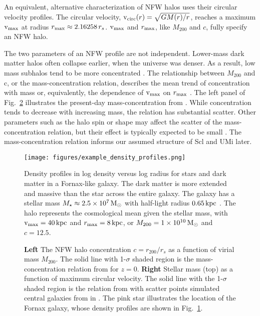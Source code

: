 An equivalent, alternative characterization of NFW halos uses their
circular velocity profiles. The circular velocity,
\({\rm v}_{\rm circ}(r) = \sqrt{G M(r) / r}\), reaches a maximum \({\rm v}_{\rm max}\) at radius
\(r_{\rm max} \approx 2.16258\,r_s\). \({\rm v}_{\rm max}\) and \(r_{\rm max}\), like
\(M_{200}\) and \(c\), fully specify an NFW halo.

The two parameters of an NFW profile are not independent. Lower-mass
dark matter halos often collapse earlier, when the universe was denser.
As a result, low mass subhalos tend to be more concentrated
\citep[e.g.,][]{NFW1997}. The relationship between \(M_{200}\) and c, or
the mass-concentration relation, describes the mean trend of
concentration with mass or, equivalently, the dependence of \({\rm v}_{\rm max}\) on
\(r_{\rm max}\) \citep[e.g.,][]{bullock+2001, ludlow+2016}. The left panel of
Fig.~\ref{fig:smhm} illustrates the present-day mass-concentration from
\citet{ludlow+2016}. While concentration tends to decrease with
increasing mass, the relation has substantial scatter. Other parameters
such as the halo spin or shape may affect the scatter of the
mass-concentration relation, but their effect is typically expected to
be small \citep{navarro+2010, dicintio+2013, dutton+maccio2014}. The
mass-concentration relation informs our assumed structure of Scl and UMi
later.

\begin{figure}
\centering
\texttt{[image: figures/example\_density\_profiles.png]}
\caption[Example dark matter and stellar density profiles]{Density
profiles in log density versus log radius for stars and dark matter in a
Fornax-like galaxy. The dark matter is more extended and massive than
the star across the entire galaxy. The galaxy has a stellar mass
\(M_\star \approx 2.5\times10^7\,{\rm M}_{\odot}\) with half-light radius
\(0.65\,{\rm kpc}\) \citep{munoz+2018, woo+courteau+dekel2008}. The halo
represents the cosmological mean given the stellar mass, with
\({\rm v}_{\rm max}=40\,{\rm kpc}\) and \(r_{\rm max}=8\,{\rm kpc}\), or
\(M_{200} = 1\times10^{10}\,{\rm M}_{\odot}\) and
\(c=12.5\).}\label{fig:nfw_density}
\end{figure}

\begin{figure}
\centering
{}
\caption[Cosmological halo mass and stellar mass
relations]{\textbf{Left} The NFW halo concentration \(c=r_{200} / r_s\)
as a function of virial mass \(M_{200}\). The solid line with
1-\(\sigma\) shaded region is the mass-concentration relation from
\citet{ludlow+2016} for \(z=0\). \textbf{Right} Stellar mass (top) as a
function of maximum circular velocity. The solid line with the
1-\(\sigma\) shaded region is the relation from \citet{fattahi+2018}
with scatter points simulated central galaxies from \apostle{} in
\citet{fattahi+2018}. The pink star illustrates the location of the
Fornax galaxy, whose density profiles are shown in
Fig.~\ref{fig:nfw_density}.}\label{fig:smhm}
\end{figure}

